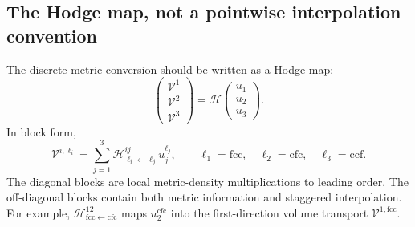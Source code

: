 \documentclass[11pt]{article}
\newcommand{\mc}[1]{\mathcal{#1}}
\newcommand{\Hodge}{\mc{H}}
\newcommand{\Vflux}{\mc{V}}
\newcommand{\loc}[1]{^{\mathrm{#1}}}
\begin{document}
\subsection{The Hodge map, not a pointwise interpolation convention}
\label{subsec:hodge-as-map}

The discrete metric conversion should be written as a Hodge map:
\begin{equation}
  \begin{pmatrix}
  \Vflux^1 \\
  \Vflux^2 \\
  \Vflux^3
  \end{pmatrix}
  =
  \Hodge
  \begin{pmatrix}
  u_1 \\
  u_2 \\
  u_3
  \end{pmatrix}.
  \label{eq:transport-hodge-map}
\end{equation}
In block form,
\begin{equation}
  \Vflux^{i,\ell_i}
  =
  \sum_{j=1}^3 \Hodge^{ij}_{\ell_i\leftarrow\ell_j} u_j^{\ell_j},
  \qquad
  \ell_1=\mathrm{fcc},\quad
  \ell_2=\mathrm{cfc},\quad
  \ell_3=\mathrm{ccf}.
  \label{eq:block-hodge}
\end{equation}
The diagonal blocks are local metric-density multiplications to leading order.  The off-diagonal blocks contain both metric information and staggered interpolation.  For example, \(\Hodge^{12}_{\mathrm{fcc}\leftarrow\mathrm{cfc}}\) maps \(u_2\loc{cfc}\) into the first-direction volume transport \(\Vflux^{1,\mathrm{fcc}}\).
\end{document}
